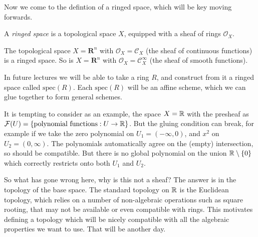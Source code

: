 




Now we come to the defintion of a ringed space, which will be key moving forwards.

\begin{definition}
    A \emph{ringed space} is a topological space $X$, equipped with a sheaf of rings $\mathcal{O}_X$.
\end{definition}

\begin{example}
  The topological space \(X = \mathbf{R}^n\) with \(\mathcal{O}_X = \mathcal{C}_X\) (the sheaf of continuous functions) is a ringed space.
  So is \(X = \mathbf{R}^n\) with \(\mathcal{O}_X = \mathcal{C}^{\infty}_X\) (the sheaf of smooth functions).
\end{example}

In future lectures we will be able to take a ring $R$, and construct from it a ringed space called $\text{spec}(R)$. Each $\text{spec}(R)$ will be an affine scheme, which we can glue together to form general schemes.




\begin{nonexample}
    It is tempting to consider as an example, the space $X = \mathbb{R}$ with the presheaf as $\mathcal{F}(U) = \{\text{polynomial functions} : U \to \mathbb{R} \}$. But the gluing condition can break, for example if we take the zero polynomial on $U_1 = (-\infty, 0)$, and $x^2$ on $U_2 = (0, \infty)$. The polynomials automatically agree on the (empty) intersection, so should be compatible. But there is no global polynomial on the union $\mathbb{R} \setminus \{0\}$ which correctly restricts onto both $U_1$ and $U_2$.
\end{nonexample}

So what has gone wrong here, why is this not a sheaf? The answer is in the topology of the base space. The standard topology on $\mathbb{R}$ is the Euclidean topology, which relies on a number of non-algebraic operations such as square rooting, that may not be available or even compatible with rings. This motivates defining a topology which will be nicely compatible with all the algebraic properties we want to use. That will be another day. 

